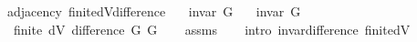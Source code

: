 \begin{isabellebody}
%
\isadelimproof
\isanewline
%
\endisadelimproof
\isanewline
{}\isamarkupfalse%
\ {\isacharparenleft}{\kern0pt}\ adjacency{\isacharparenright}{\kern0pt}\ finite{\isacharunderscore}{\kern0pt}dV{\isacharunderscore}{\kern0pt}difference{\isacharcolon}{\kern0pt}\isanewline
\ \ \ {\isachardoublequoteopen}invar\ G{}{\isachardoublequoteclose}\isanewline
\ \ \ {\isachardoublequoteopen}invar\ G{}{\isachardoublequoteclose}\isanewline
\ \ \ {\isachardoublequoteopen}finite\ {\isacharparenleft}{\kern0pt}dV\ {\isacharparenleft}{\kern0pt}difference\ G{}\ G{}{\isacharparenright}{\kern0pt}{\isacharparenright}{\kern0pt}{\isachardoublequoteclose}\isanewline
%
\isadelimproof
\ \ %
\endisadelimproof
%
\isatagproof
{}\isamarkupfalse%
\ assms\isanewline
\ \ \isamarkupfalse%
\ {\isacharparenleft}{\kern0pt}intro\ invar{\isacharunderscore}{\kern0pt}difference\ finite{\isacharunderscore}{\kern0pt}dV{\isacharparenright}{\kern0pt}%
\endisatagproof
{\isafoldproof}%
%
\isadelimproof
\isanewline
%
\endisadelimproof
%
\isadelimtheory
\isanewline
%
\endisadelimtheory
%
\isatagtheory
{}\isamarkupfalse%
%
\endisatagtheory
{\isafoldtheory}%
%
\isadelimtheory
%
\endisadelimtheory
%
\end{isabellebody}%
\endinput
